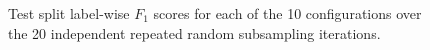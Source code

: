 \documentclass[\main/thesis.tex]{subfiles}
\begin{document}
\begin{appendices}
\begin{figure}[t]
    \centering
    \caption{Test split label-wise $F_1$ scores for each of the 10 configurations over the 20 independent repeated random subsampling iterations.}
    \label{fig:xgb_aenc_label_f1s_10_configuration}
\end{figure}


\end{appendices}
\end{document}
